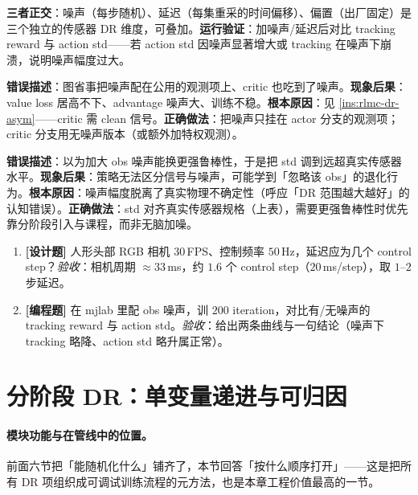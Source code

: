 \textbf{三者正交}：噪声（每步随机）、延迟（每集重采的时间偏移）、偏置（出厂固定）是三个独立的传感器 DR 维度，可叠加。\textbf{运行验证}：加噪声/延迟后对比 tracking reward 与 action std——若 action std 因噪声显著增大或 tracking 在噪声下崩溃，说明噪声幅度过大。

\begin{pitfall}
\textbf{错误描述}：图省事把噪声配在公用的观测项上、critic 也吃到了噪声。\textbf{现象后果}：value loss 居高不下、advantage 噪声大、训练不稳。\textbf{根本原因}：见 \cref{ins:rlmc-dr-asym}——critic 需 clean 信号。\textbf{正确做法}：把噪声只挂在 actor 分支的观测项；critic 分支用无噪声版本（或额外加特权观测）。
\end{pitfall}

\begin{pitfall}
\textbf{错误描述}：以为加大 obs 噪声能换更强鲁棒性，于是把 std 调到远超真实传感器水平。\textbf{现象后果}：策略无法区分信号与噪声，可能学到「忽略该 obs」的退化行为。\textbf{根本原因}：噪声幅度脱离了真实物理不确定性（呼应「DR 范围越大越好」的认知错误）。\textbf{正确做法}：std 对齐真实传感器规格（上表），需要更强鲁棒性时优先靠分阶段引入与课程，而非无脑加噪。
\end{pitfall}

\begin{practice}[本节练习]
\begin{enumerate}
  \item \textbf{[设计题]} 人形头部 RGB 相机 $30$\,FPS、控制频率 $50$\,Hz，延迟应为几个 control step？\emph{验收}：相机周期 $\approx 33$\,ms，约 $1.6$ 个 control step（$20$\,ms/step），取 $1$--$2$ 步延迟。
  \item \textbf{[编程题]} 在 mjlab 里配 obs 噪声，训 $200$ iteration，对比有/无噪声的 tracking reward 与 action std。\emph{验收}：给出两条曲线与一句结论（噪声下 tracking 略降、action std 略升属正常）。
\end{enumerate}
\end{practice}

\section{分阶段 DR：单变量递进与可归因}
\label{sec:rlmc-dr-phased}

\paragraph{模块功能与在管线中的位置。}前面六节把「能随机化什么」铺齐了，本节回答「按什么顺序打开」——这是把所有 DR 项组织成可调试训练流程的元方法，也是本章工程价值最高的一节。

